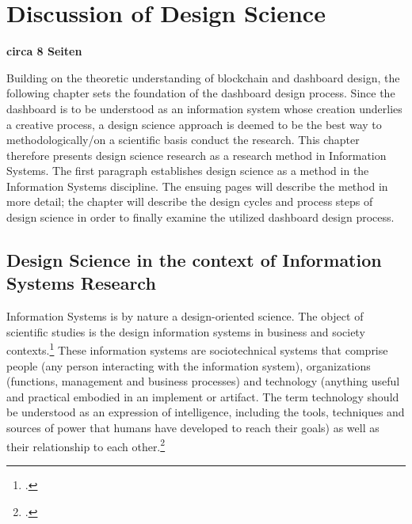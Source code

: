 \chapter{Discussion of Design Science}
\textbf{circa 8 Seiten}

Building on the theoretic understanding of blockchain and dashboard design, the following chapter sets the foundation of the dashboard design process. Since the dashboard is to be understood as an information system whose creation underlies a creative process, a design science approach is deemed to be the best way to methodologically/on a scientific basis conduct the research. This chapter therefore presents design science research as a research method in Information Systems. The first paragraph establishes design science as a method in the Information Systems discipline. The ensuing pages will describe the method in more detail; the chapter will describe the design cycles and process steps of design science in order to finally examine the utilized dashboard design process.

\section{Design Science in the context of Information Systems Research}

Information Systems is by nature a design-oriented science. The object of scientific studies is the design information systems in business and society contexts.\footcite[Cf.][p.671]{OsterleMemorandumzurgestaltungsorientierten2010} These information systems are sociotechnical systems that comprise people (any person interacting with the information system), organizations (functions, management and business processes) and technology (anything useful and practical embodied in an implement or artifact. The term technology should be understood as an expression of intelligence, including the tools, techniques and sources of power that humans have developed to reach their goals) as well as their relationship to each other.\footcites[Cf.][p.98]{HevnerDesignScienceResearch2004}[cf.][p.11]{OsterleGestaltungsorientierteWirtschaftsinformatikPladoyer2010}[cf.][p.252]{MarchDesignnaturalscience1995}

